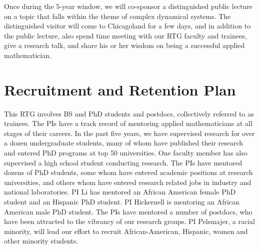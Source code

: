 \documentclass[11pt]{NSFamsart}
\begin{document}
Once during the 5-year window, we will co-sponsor a distinguished public lecture  on a topic that falls within the theme of complex dynamical systems.  The distinguished visitor will come to Chicagoland for a few days, and in addition to the public lecture, also spend time meeting with our RTG faculty and trainees, give a research talk, and share his or her wisdom on being a successful applied mathematician. 




\section{Recruitment and Retention Plan} \label{sec:RandR}

This RTG involves BS and PhD students and postdocs, collectively referred to as trainees.  The PIs have a track record of mentoring  applied mathematicians at all stages of their careers.  In the past five years, we have supervised research for over a dozen undergraduate students, many of whom have published their research and entered PhD programs at top 50 universities. One faculty member has also supervised a high school student conducting research.  The PIs have  mentored dozens of PhD students, some whom have entered academic positions at research universities, and others whom have entered research related jobs in industry and national laboratories. PI Li has mentored an African American female PhD student and an Hispanic PhD student. PI Hickernell is mentoring an African American male PhD student.  The PIs have  mentored a number of postdocs, who have been attracted to the vibrancy of our research groups. PI  Pelsmajer, a racial minority, will lead our effort to 
recruit African-American, Hispanic, women and other minority students.
\end{document}
